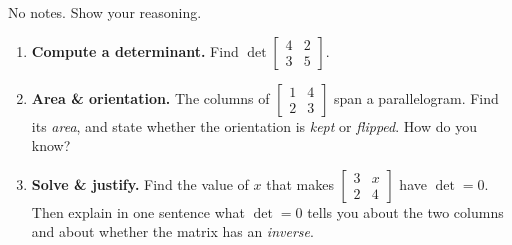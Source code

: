 \documentclass[10pt]{article}
\begin{document}
\namedateperiod

\vspace{0.15in}

No notes. Show your reasoning.

\begin{enumerate}[leftmargin=1.8em, itemsep=16pt]
  \item \textbf{Compute a determinant.} Find
        $\det\begin{bmatrix} 4 & 2 \\ 3 & 5 \end{bmatrix}$.
        \vspace{1.0cm}
  \item \textbf{Area \& orientation.} The columns of $\begin{bmatrix} 1 & 4 \\ 2 & 3 \end{bmatrix}$ span
        a parallelogram. Find its \emph{area}, and state whether the orientation is \emph{kept} or
        \emph{flipped}. How do you know?
        \vspace{1.3cm}
  \item \textbf{Solve \& justify.} Find the value of $x$ that makes
        $\begin{bmatrix} 3 & x \\ 2 & 4 \end{bmatrix}$ have $\det=0$. Then explain in one sentence what
        $\det=0$ tells you about the two columns and about whether the matrix has an \emph{inverse}.
\end{enumerate}
\end{document}
